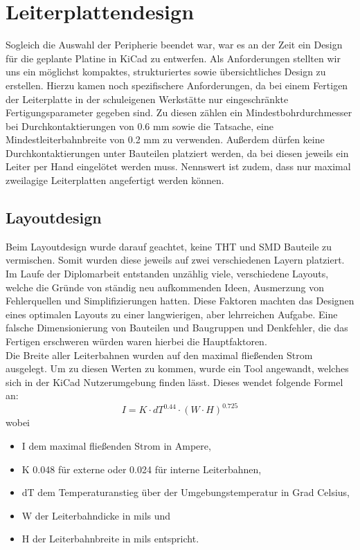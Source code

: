 \section{Leiterplattendesign}

Sogleich die Auswahl der Peripherie beendet war, war es an der Zeit ein Design für die geplante Platine in KiCad zu entwerfen.
Als Anforderungen stellten wir uns ein möglichst kompaktes, strukturiertes sowie übersichtliches Design zu erstellen.
Hierzu kamen noch spezifischere Anforderungen, da bei einem Fertigen der Leiterplatte in der schuleigenen Werkstätte nur eingeschränkte Fertigungsparameter gegeben sind.
Zu diesen zählen ein Mindestbohrdurchmesser bei Durchkontaktierungen von 0.6 mm sowie die Tatsache, eine Mindestleiterbahnbreite von 0.2 mm zu verwenden.
Außerdem dürfen keine Durchkontaktierungen unter Bauteilen platziert werden, da bei diesen jeweils ein Leiter per Hand eingelötet werden muss.
Nennswert ist zudem, dass nur maximal zweilagige Leiterplatten angefertigt werden können.

\subsection{Layoutdesign}

Beim Layoutdesign wurde darauf geachtet, keine THT und SMD Bauteile zu vermischen.
Somit wurden diese jeweils auf zwei verschiedenen Layern platziert. \\
Im Laufe der Diplomarbeit entstanden unzählig viele, verschiedene Layouts, welche die Gründe von ständig neu aufkommenden Ideen, Ausmerzung von Fehlerquellen und Simplifizierungen hatten.
Diese Faktoren machten das Designen eines optimalen Layouts zu einer langwierigen, aber lehrreichen Aufgabe.
Eine falsche Dimensionierung von Bauteilen und Baugruppen und Denkfehler, die das Fertigen erschweren würden waren hierbei die Hauptfaktoren. \\

Die Breite aller Leiterbahnen wurden auf den maximal fließenden Strom ausgelegt.
Um zu diesen Werten zu kommen, wurde ein Tool angewandt, welches sich in der KiCad Nutzerumgebung finden lässt.
Dieses wendet folgende Formel an: \\

\begin{equation}
    I = K \cdot dT^{0.44} \cdot (W \cdot H)^{0.725}
\end{equation}
wobei
\begin{itemize}
    \item I dem maximal fließenden Strom in Ampere,
    \item K 0.048 für externe oder 0.024 für interne Leiterbahnen,
    \item dT dem Temperaturanstieg über der Umgebungstemperatur in Grad Celsius,
    \item W der Leiterbahndicke in mils und
    \item H der Leiterbahnbreite in mils entspricht.
\end{itemize}

